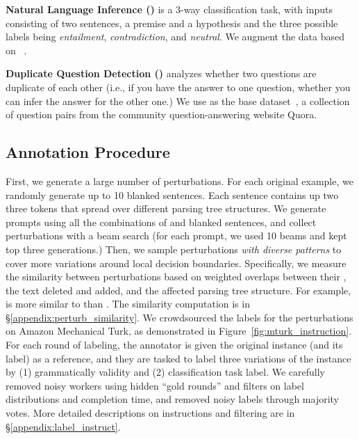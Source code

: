 \textbf{Natural Language Inference (\nli)} is a 3-way classification task, with inputs consisting of two sentences, a premise and a hypothesis and the three possible labels being \emph{entailment}, \emph{contradiction}, and \emph{neutral}.
 We augment the data based on \dnli~\cite{bowman-etal-2015-large}. 
 
\textbf{Duplicate Question Detection (\qqp)} analyzes whether two questions are duplicate of each other (i.e., if you have the answer to one question, whether you can infer the answer for the other one.) 
We use \dqqp as the base dataset~\cite{wang2018glue}, a collection of question pairs from the community question-answering website Quora.



\subsection{Annotation Procedure}
\label{subsec:label_procedure}
First, we generate a large number of perturbations.
For each original example, we randomly generate up to 10 blanked sentences. Each sentence contains up two three \BLANK tokens that spread over different parsing tree structures.
We generate prompts using all the combinations of \tagstrs and blanked sentences, and collect perturbations with a beam search (for each prompt, we used 10 beams and kept top three generations.)
Then, we sample perturbations \emph{with diverse patterns} to cover more variations around local decision boundaries.
Specifically, we measure the similarity between perturbations based on weighted overlaps between their \tagstrs, the text deleted and added, and the affected parsing tree structure. 
For example, \ctrltag{[lexical]}  is more similar to \ctrltag{[lexical]}  than \ctrltag{[quantifier]} .
The similarity computation is in \S\ref{appendix:perturb_similarity}. 
We crowdsourced the labels for the perturbations on Amazon Mechanical Turk, as demonstrated in Figure~\ref{fig:mturk_instruction}. 
For each round of labeling, the annotator is given the original instance (and its label) as a reference, and they are tasked to label three variations of the instance by (1) grammatically validity and (2) classification task label. 
We carefully removed noisy workers using hidden ``gold rounds'' and filters on label distributions and completion time, and removed noisy labels through majority votes.
More detailed descriptions on instructions and filtering are in \S\ref{appendix:label_instruct}. 


